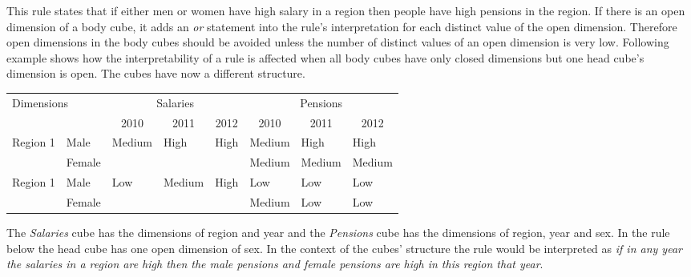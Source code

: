 This rule states that if either men or women have high salary in a region then people have high pensions in the region. If there is an open dimension of a body cube, it adds an \textit{or} statement into the rule's interpretation for each distinct value of the open dimension. Therefore open dimensions in the body cubes should be avoided unless the number of distinct values of an open dimension is very low. Following example shows how the interpretability of a rule is affected when all body cubes have only closed dimensions but one head cube's dimension is open. The cubes have now a different structure.

\begin{table}[h]
\centering
\begin{tabular}{ll|lll|lll}
\multicolumn{2}{l|}{\multirow{2}{*}{Dimensions}} & \multicolumn{3}{c|}{Salaries}                                                   & \multicolumn{3}{c}{Pensions}                                                    \\
\multicolumn{2}{l|}{}                            & \multicolumn{1}{c}{2010} & \multicolumn{1}{c}{2011} & \multicolumn{1}{c|}{2012} & \multicolumn{1}{c}{2010} & \multicolumn{1}{c}{2011} & \multicolumn{1}{c}{2012}  \\ 
\hline
\multirow{2}{*}{Region 1} & Male                 & \multirow{2}{*}{Medium}  & \multirow{2}{*}{High}    & \multirow{2}{*}{High}     & Medium                   & High                     & High                      \\
                          & Female               &                          &                          &                           & Medium                   & Medium                   & Medium                    \\
\multirow{2}{*}{Region 1} & Male                 & \multirow{2}{*}{Low}     & \multirow{2}{*}{Medium}  & \multirow{2}{*}{High}     & Low                      & Low                      & Low                       \\
                          & Female               &                          &                          &                           & Medium                   & Low                      & Low                      
\end{tabular}
\end{table}

The \textit{Salaries} cube has the dimensions of region and year and the \textit{Pensions} cube has the dimensions of region, year and sex. In the rule below the head cube has one open dimension of sex. In the context of the cubes' structure the rule would be interpreted as \textit{if in any year the salaries in a region are high then the male pensions and female pensions are high in this region that year}. 

